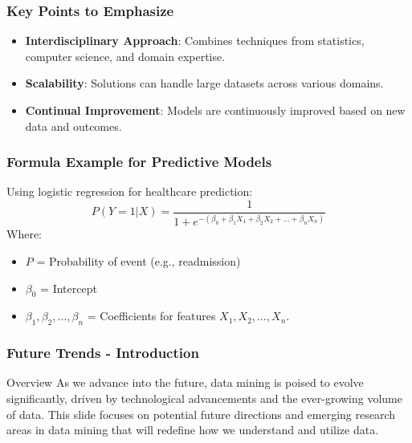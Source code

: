 \documentclass{beamer}
\begin{document}
\begin{frame}[fragile]
    \frametitle{Key Points to Emphasize}
    \begin{itemize}
        \item \textbf{Interdisciplinary Approach}: Combines techniques from statistics, computer science, and domain expertise.
        \item \textbf{Scalability}: Solutions can handle large datasets across various domains.
        \item \textbf{Continual Improvement}: Models are continuously improved based on new data and outcomes.
    \end{itemize}
\end{frame}

\begin{frame}[fragile]
    \frametitle{Formula Example for Predictive Models}
    Using logistic regression for healthcare prediction:
    \begin{equation}
        P(Y=1|X) = \frac{1}{1 + e^{-(\beta_0 + \beta_1X_1 + \beta_2X_2 + \ldots + \beta_nX_n)}}
    \end{equation}
    Where:
    \begin{itemize}
        \item \( P \) = Probability of event (e.g., readmission)
        \item \( \beta_0 \) = Intercept
        \item \( \beta_1, \beta_2, \dots, \beta_n \) = Coefficients for features \( X_1, X_2, \dots, X_n \).
    \end{itemize}
\end{frame}

\begin{frame}[fragile]
    \frametitle{Future Trends - Introduction}
    \begin{block}{Overview}
        As we advance into the future, data mining is poised to evolve significantly, driven by technological advancements and the ever-growing volume of data. This slide focuses on potential future directions and emerging research areas in data mining that will redefine how we understand and utilize data.
    \end{block}
\end{frame}
\end{document}
